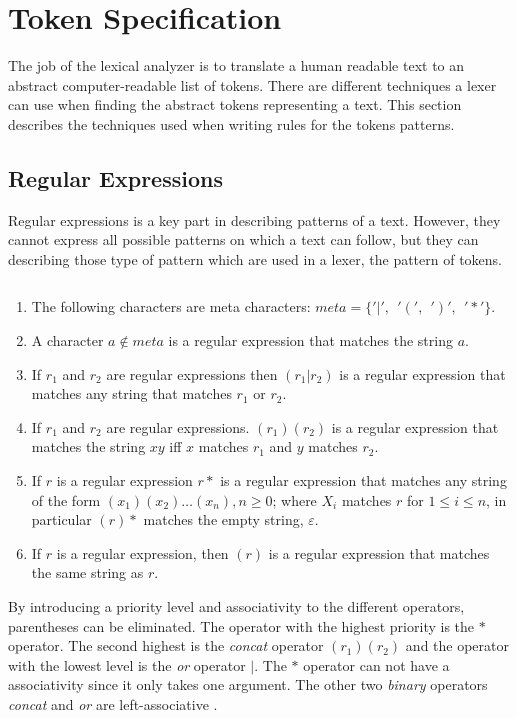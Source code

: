 \section{Token Specification}
The job of the lexical analyzer is to translate a human readable text to an
abstract computer-readable list of tokens. There are different techniques a
lexer can use when finding the abstract tokens representing a text. This section
describes the techniques used when writing rules for the tokens patterns.

\subsection{Regular Expressions}
Regular expressions is a key part in describing patterns of a text. However,
they cannot express all possible patterns on which a text can follow, but they
can describing those type of pattern which are used in a lexer, the pattern of
tokens.

\begin{definition}\label{regexp} $ $\\
\begin{enumerate}
  \item The following characters are meta characters: $meta = \{ '|', ~~ '(', ~~ ')', ~~ '*' \}$.
  \item A character $a \notin meta$ is a regular expression that matches the 
      string $a$.
  \item If $r_1$ and $r_2$ are regular expressions then $(r_1 | r_2)$ is a 
      regular expression that matches any string that matches $r_1$ or $r_2$.
  \item If $r_1$ and $r_2$ are regular expressions. $(r_1)(r_2)$ is a regular
      expression that matches the string $xy$ iff $x$ matches $r_1$
      and $y$ matches $r_2$.
  \item If $r$ is a regular expression $r*$ is a regular expression that
      matches any string of the form $(x_1)(x_2) \dots  (x_n), n \geq 0$;
      where $X_i$ matches $r$ for $1 \leq i \leq n$, in particular $(r)*$ 
      matches the empty string, $\varepsilon$.
  \item If $r$ is a regular expression, then $(r)$ is a regular expression that
      matches the same string as $r$.
\end{enumerate}
\qeda
\end{definition}

By introducing a priority level and associativity to the different operators,
parentheses can be eliminated. The operator with the highest priority is the $*$
operator. The second highest is the \emph{concat} operator $(r_1)(r_2)$ and the
operator with the lowest level is the \emph{or} operator $|$. The $*$ operator
can not have a associativity since it only takes one argument. The other two
\emph{binary} operators \emph{concat} and \emph{or} are left-associative
\cite{Aho1990}.

